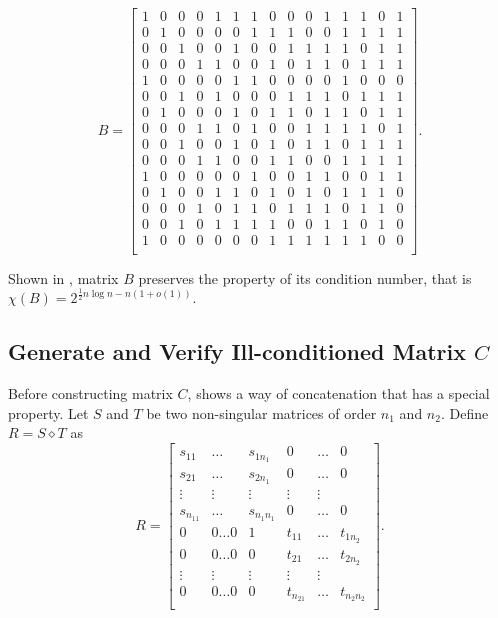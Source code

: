 \documentclass[11pt]{article}
\begin{document}
$$B=
\left[\begin{smallmatrix}
    1 & 0 & 0 & 0 & 1 & 1 & 1 & 0 & 0 & 0 & 1 & 1 & 1 & 0 & 1 \\
    0 & 1 & 0 & 0 & 0 & 0 & 1 & 1 & 1 & 0 & 0 & 1 & 1 & 1 & 1 \\
    0 & 0 & 1 & 0 & 0 & 1 & 0 & 0 & 1 & 1 & 1 & 1 & 0 & 1 & 1 \\
    0 & 0 & 0 & 1 & 1 & 0 & 0 & 1 & 0 & 1 & 1 & 0 & 1 & 1 & 1 \\
    1 & 0 & 0 & 0 & 0 & 1 & 1 & 0 & 0 & 0 & 0 & 1 & 0 & 0 & 0 \\
    0 & 0 & 1 & 0 & 1 & 0 & 0 & 0 & 1 & 1 & 1 & 0 & 1 & 1 & 1 \\
    0 & 1 & 0 & 0 & 0 & 1 & 0 & 1 & 1 & 0 & 1 & 1 & 0 & 1 & 1 \\
    0 & 0 & 0 & 1 & 1 & 0 & 1 & 0 & 0 & 1 & 1 & 1 & 1 & 0 & 1 \\
    0 & 0 & 1 & 0 & 0 & 1 & 0 & 1 & 0 & 1 & 1 & 0 & 1 & 1 & 1 \\
    0 & 0 & 0 & 1 & 1 & 0 & 0 & 1 & 1 & 0 & 0 & 1 & 1 & 1 & 1 \\
    1 & 0 & 0 & 0 & 0 & 0 & 1 & 0 & 0 & 1 & 1 & 0 & 0 & 1 & 1 \\
    0 & 1 & 0 & 0 & 1 & 1 & 0 & 1 & 0 & 1 & 0 & 1 & 1 & 1 & 0 \\
    0 & 0 & 0 & 1 & 0 & 1 & 1 & 0 & 1 & 1 & 1 & 0 & 1 & 1 & 0 \\
    0 & 0 & 1 & 0 & 1 & 1 & 1 & 1 & 0 & 0 & 1 & 1 & 0 & 1 & 0 \\
    1 & 0 & 0 & 0 & 0 & 0 & 0 & 1 & 1 & 1 & 1 & 1 & 1 & 0 & 0 \\
\end{smallmatrix}\right].
$$

Shown in \cite{ALON1997133}, matrix $B$ preserves the property of its condition number, that is $\chi(B)=2^{\frac{1}{2}n\log n-n(1+o(1))}$.

\subsection{Generate and Verify Ill-conditioned Matrix $C$}
Before constructing matrix $C$, \cite{ALON1997133} shows a way of concatenation that has a special property. Let $S$ and $T$ be two non-singular matrices of order $n_1$ and $n_2$. Define $R = S \diamond T$ as
$$R=
\left[\begin{smallmatrix}
    s_{11} & \dots & s_{1n_1} & 0 & \dots  & 0 \\
    s_{21} & \dots & s_{2n_1} & 0 & \dots  & 0 \\
    \vdots & \vdots & \vdots & \vdots & \vdots \\
    s_{n_11} & \dots & s_{n_1n_1} & 0 & \dots  & 0 \\
    0 & 0 \dots 0 & 1 & t_{11} & \dots & t_{1n_2} \\
    0 & 0 \dots 0 & 0 & t_{21} & \dots & t_{2n_2} \\
    \vdots & \vdots & \vdots & \vdots & \vdots \\
    0 & 0 \dots 0 & 0 & t_{n_21} & \dots & t_{n_2n_2} \\
\end{smallmatrix}\right].
$$
\end{document}
